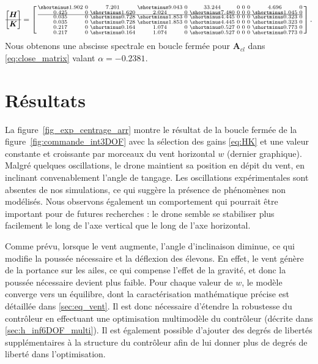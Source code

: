 \begin{align}\label{eq:HK}
\begin{bmatrix}
    \boldsymbol{H}\\ \hline \boldsymbol{K }
\end{bmatrix} = \smallmat{
\shortminus1.902 & 0 & 7.201 & \shortminus9.043  & 0 & 33.244 & 0 & 0 & 0 & 4.696  & 0 \\ 
0.425 & 0 & \shortminus1.620 & 2.024  & 0 & \shortminus7.480 & 0 & 0 & 0 & \shortminus1.045  & 0 \\  \hline
0.035 & 0 & \shortminus0.728 & \shortminus1.853  & 0 & \shortminus4.445 & 0 & 0 & 0 & \shortminus0.323  & 0 \\ 
0.035 & 0 & \shortminus0.728 & \shortminus1.853  & 0 & \shortminus4.445 & 0 & 0 & 0 & \shortminus0.323  & 0 \\ 
0.217  & 0 & \shortminus0.164  & 1.074 & 0 & \shortminus0.527 & 0 & 0 & 0 & \shortminus0.773 & 0 \\ 
0.217  & 0 & \shortminus0.164  & 1.074 & 0 & \shortminus0.527 & 0 & 0 & 0 & \shortminus0.773 & 0  
}.
\end{align}
Nous obtenons une abscisse spectrale en boucle fermée pour $\boldsymbol{A}_{cl}$ dans \eqref{eq:close_matrix} valant $\alpha = -0.2381$.

\section{Résultats}
\label{sec:exp3DOF}
La figure~\ref{fig_exp_centrage_arr} montre le résultat de la boucle fermée de la figure~\ref{fig:commande_int3DOF} avec la sélection des gains \eqref{eq:HK} et une valeur constante et croissante par morceaux du vent horizontal $w$ (dernier graphique). 
Malgré quelques oscillations, le drone maintient sa position en dépit du vent, en inclinant convenablement l'angle de tangage. Les oscillations expérimentales sont absentes de nos simulations, ce qui suggère la présence de phénomènes non modélisés.
Nous observons également un comportement qui pourrait être important pour de futures recherches : le drone semble se stabiliser plus facilement le long de l'axe vertical que le long de l'axe horizontal. 

Comme prévu, lorsque le vent augmente, l'angle d'inclinaison diminue, ce qui modifie la poussée nécessaire et la déflexion des élevons. En effet, le vent génère de la portance sur les ailes, ce qui compense l'effet de la gravité, et donc la poussée nécessaire devient plus faible.
Pour chaque valeur de $w$, le modèle converge vers un équilibre, dont la caractérisation mathématique précise est détaillée dans \ref{sec:eq_vent}. Il est donc nécessaire d'étendre la robustesse du contrôleur en effectuant une optimisation multimodèle du contrôleur (décrite dans \ref{sec:h_inf6DOF_multi}). Il est également possible d'ajouter des degrés de libertés supplémentaires à  la structure du contrôleur afin de lui donner plus de degrés de liberté dans l'optimisation.

